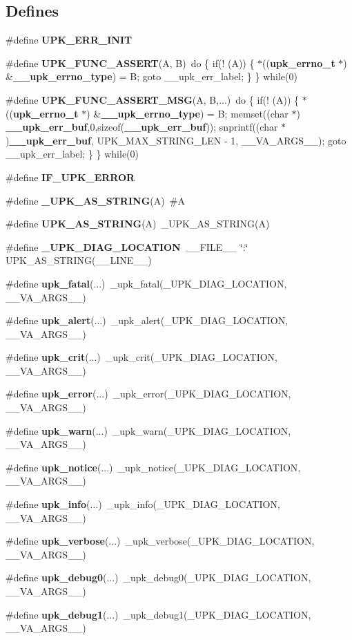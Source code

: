 \subsection*{Defines}
\begin{DoxyCompactItemize}
\item 
\#define {\bf UPK\_\-ERR\_\-INIT}
\item 
\#define {\bf UPK\_\-FUNC\_\-ASSERT}(A, B)~do \{ if(! (A)) \{ $\ast$(({\bf upk\_\-errno\_\-t} $\ast$) \&{\bf \_\-\_\-upk\_\-errno\_\-type}) = B; goto \_\-\_\-upk\_\-err\_\-label; \} \} while(0)
\item 
\#define {\bf UPK\_\-FUNC\_\-ASSERT\_\-MSG}(A, B,...)~do \{ if(! (A)) \{ $\ast$(({\bf upk\_\-errno\_\-t} $\ast$) \&{\bf \_\-\_\-upk\_\-errno\_\-type}) = B; memset((char $\ast$) {\bf \_\-\_\-upk\_\-err\_\-buf},0,sizeof({\bf \_\-\_\-upk\_\-err\_\-buf})); snprintf((char $\ast$){\bf \_\-\_\-upk\_\-err\_\-buf}, UPK\_\-MAX\_\-STRING\_\-LEN -\/ 1, \_\-\_\-VA\_\-ARGS\_\-\_\-); goto \_\-\_\-upk\_\-err\_\-label; \} \} while(0)
\item 
\#define {\bf IF\_\-UPK\_\-ERROR}
\item 
\#define {\bf \_\-UPK\_\-AS\_\-STRING}(A)~\#A
\item 
\#define {\bf UPK\_\-AS\_\-STRING}(A)~\_\-UPK\_\-AS\_\-STRING(A)
\item 
\#define {\bf \_\-UPK\_\-DIAG\_\-LOCATION}~\_\-\_\-FILE\_\-\_\- \char`\"{}:\char`\"{} UPK\_\-AS\_\-STRING(\_\-\_\-LINE\_\-\_\-)
\item 
\#define {\bf upk\_\-fatal}(...)~\_\-upk\_\-fatal(\_\-UPK\_\-DIAG\_\-LOCATION, \_\-\_\-VA\_\-ARGS\_\-\_\-)
\item 
\#define {\bf upk\_\-alert}(...)~\_\-upk\_\-alert(\_\-UPK\_\-DIAG\_\-LOCATION, \_\-\_\-VA\_\-ARGS\_\-\_\-)
\item 
\#define {\bf upk\_\-crit}(...)~\_\-upk\_\-crit(\_\-UPK\_\-DIAG\_\-LOCATION, \_\-\_\-VA\_\-ARGS\_\-\_\-)
\item 
\#define {\bf upk\_\-error}(...)~\_\-upk\_\-error(\_\-UPK\_\-DIAG\_\-LOCATION, \_\-\_\-VA\_\-ARGS\_\-\_\-)
\item 
\#define {\bf upk\_\-warn}(...)~\_\-upk\_\-warn(\_\-UPK\_\-DIAG\_\-LOCATION, \_\-\_\-VA\_\-ARGS\_\-\_\-)
\item 
\#define {\bf upk\_\-notice}(...)~\_\-upk\_\-notice(\_\-UPK\_\-DIAG\_\-LOCATION, \_\-\_\-VA\_\-ARGS\_\-\_\-)
\item 
\#define {\bf upk\_\-info}(...)~\_\-upk\_\-info(\_\-UPK\_\-DIAG\_\-LOCATION, \_\-\_\-VA\_\-ARGS\_\-\_\-)
\item 
\#define {\bf upk\_\-verbose}(...)~\_\-upk\_\-verbose(\_\-UPK\_\-DIAG\_\-LOCATION, \_\-\_\-VA\_\-ARGS\_\-\_\-)
\item 
\#define {\bf upk\_\-debug0}(...)~\_\-upk\_\-debug0(\_\-UPK\_\-DIAG\_\-LOCATION, \_\-\_\-VA\_\-ARGS\_\-\_\-)
\item 
\#define {\bf upk\_\-debug1}(...)~\_\-upk\_\-debug1(\_\-UPK\_\-DIAG\_\-LOCATION, \_\-\_\-VA\_\-ARGS\_\-\_\-)
\end{DoxyCompactItemize}

